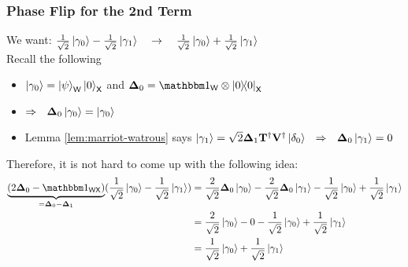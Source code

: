 \documentclass[aspectratio=1610, 12pt, xcolor={dvipsnames}]{beamer}
\begin{document}
\begin{frame}
\frametitle{Phase Flip for the 2nd Term}

We want: $\frac{1}{\sqrt{2}}\ket{\gamma_0} - \frac{1}{\sqrt{2}}\ket{\gamma_1} ~~~\rightarrow~~~ \frac{1}{\sqrt{2}}\ket{\gamma_0} + \frac{1}{\sqrt{2}}\ket{\gamma_1}$ \\[0.5em]

Recall the following 
\begin{itemize}
\item
$\ket{\gamma_0} = \ket{\psi}_\reg{w} \ket{0}_\reg{x}$ and $\vb{\Delta}_0 = \idm_\reg{w}\tensor\ketbra{0}_\reg{x}$
\item
$\Rightarrow ~~ \vb{\Delta}_0 \ket{\gamma_0} = \ket{\gamma_0}$
\item
Lemma \ref{lem:marriot-watrous} says $\ket{\gamma_1} = \sqrt{2}\vb{\Delta}_1 \vb{T}^\dagger \vb{V}^\dagger \ket{\delta_0} ~~\Rightarrow ~~ \vb{\Delta}_0 \ket{\gamma_1} = 0$
\end{itemize}

Therefore, it is not hard to come up with the following idea:
\begin{align*}
\underbrace{(2\vb{\Delta}_0 - \idm_\reg{wx})}_{=\vb{\Delta}_0 - \vb{\Delta}_1} (\frac{1}{\sqrt{2}}\ket{\gamma_0} - \frac{1}{\sqrt{2}}\ket{\gamma_1})
&= \frac{2}{\sqrt{2}}\vb{\Delta}_0 \ket{\gamma_0} - \frac{2}{\sqrt{2}}\vb{\Delta}_0 \ket{\gamma_1} - \frac{1}{\sqrt{2}}\ket{\gamma_0} + \frac{1}{\sqrt{2}}\ket{\gamma_1} \\
&= \frac{2}{\sqrt{2}}\ket{\gamma_0} - 0 - \frac{1}{\sqrt{2}}\ket{\gamma_0} + \frac{1}{\sqrt{2}}\ket{\gamma_1} \\
&= \frac{1}{\sqrt{2}}\ket{\gamma_0} + \frac{1}{\sqrt{2}}\ket{\gamma_1}
\end{align*}
\end{frame}
\end{document}

